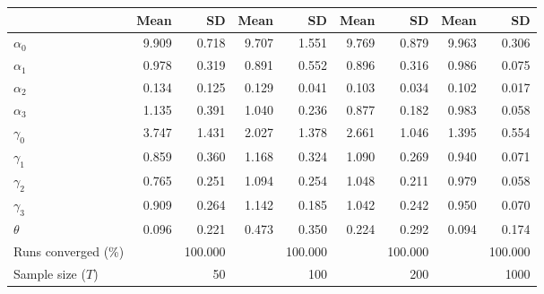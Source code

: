 
\begin{tabular}[t]{lrrrrrrrr}
\toprule
  & Mean & SD & Mean  & SD  & Mean   & SD   & Mean    & SD   \\
\midrule
$\alpha_{0}$ & 9.909 & 0.718 & 9.707 & 1.551 & 9.769 & 0.879 & 9.963 & 0.306\\
$\alpha_{1}$ & 0.978 & 0.319 & 0.891 & 0.552 & 0.896 & 0.316 & 0.986 & 0.075\\
$\alpha_{2}$ & 0.134 & 0.125 & 0.129 & 0.041 & 0.103 & 0.034 & 0.102 & 0.017\\
$\alpha_{3}$ & 1.135 & 0.391 & 1.040 & 0.236 & 0.877 & 0.182 & 0.983 & 0.058\\
$\gamma_{0}$ & 3.747 & 1.431 & 2.027 & 1.378 & 2.661 & 1.046 & 1.395 & 0.554\\
$\gamma_{1}$ & 0.859 & 0.360 & 1.168 & 0.324 & 1.090 & 0.269 & 0.940 & 0.071\\
$\gamma_{2}$ & 0.765 & 0.251 & 1.094 & 0.254 & 1.048 & 0.211 & 0.979 & 0.058\\
$\gamma_{3}$ & 0.909 & 0.264 & 1.142 & 0.185 & 1.042 & 0.242 & 0.950 & 0.070\\
$\theta$ & 0.096 & 0.221 & 0.473 & 0.350 & 0.224 & 0.292 & 0.094 & 0.174\\
Runs converged (\%) &  & 100.000 &  & 100.000 &  & 100.000 &  & 100.000\\
Sample size ($T$) &  & 50 &  & 100 &  & 200 &  & 1000\\
\bottomrule
\end{tabular}
